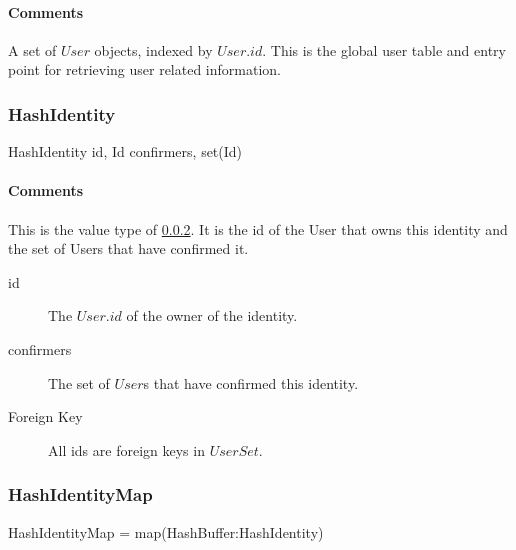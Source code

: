\documentclass[a4paper,10pt]{article}
\begin{document}
\paragraph*{Comments}
A set of $User$ objects, indexed by $User.id$. This is the global user table and entry point for retrieving user related information.

\subsubsection{HashIdentity}

\begin{verbbox}
HashIdentity
{
  id, Id
  confirmers, set(Id)
}
\end{verbbox}
\begin{center}
\theverbbox
\end{center}

\begin{inparaitem}[ ]
 \item \infrastructure
\end{inparaitem}

\paragraph*{Comments}
This is the value type of \ref{sec:structure:server:hash_identity_map}. It is the id of the User that owns this identity and the set of Users that have confirmed it.

\SpecialItem
\begin{description}
 \item[id] The $User.id$ of the owner of the identity.
 \item[confirmers] The set of $User$s that have confirmed this identity.
\end{description}

\SpecialItem
\begin{description}
 \item[Foreign Key] All ids are foreign keys in $UserSet$.
\end{description}

\subsubsection{HashIdentityMap}
\label{sec:structure:server:hash_identity_map}
\begin{verbbox}
HashIdentityMap = map(HashBuffer:HashIdentity)
\end{verbbox}
\begin{center}
\theverbbox
\end{center}
\end{document}

